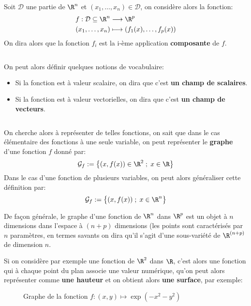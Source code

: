 Soit \(\mathcal{D}\) une partie de \(\R^n\) et \((x_1, \ldots, x_n) \in \mathcal{D}\), on considère alors la fonction:
\[
   \begin{aligned}
      f : \mathcal{D} \subseteq \R^n &\longrightarrow \R^p \\
      (x_1, \ldots, x_n) &\longmapsto (f_1(x), \ldots, f_p(x))
   \end{aligned}
\]
On dira alors que la fonction \(f_i\) est la i-ème application \textbf{composante} de \(f\).\+

\subsection*{}
On peut alors définir quelques notions de vocabulaire:
\begin{itemize}
   \item Si la fonction est à valeur scalaire, on dira que c'est \textbf{un champ de scalaires}.
   \item Si la fonction est à valeur vectorielles, on dira que c'est \textbf{un champ de vecteurs}.
\end{itemize}
\subsection*{}
On cherche alors à représenter de telles fonctions, on sait que dans le cas élémentaire des fonctions à une seule variable, on peut représenter le \textbf{graphe} d'une fonction \(f\) donné par:
\[
   \mathcal{G}_f := \bigl\{ (x, f(x)) \in \R^2 \; ; \; x \in \R \bigl\}   
\]
Dans le cas d'une fonction de plusieurs variables, on peut alors généraliser cette définition par:
\[
   \mathcal{G}_f := \bigl\{ (x, f(x)) \; ; \; x \in \R^n \bigl\}  
\]

De façon générale, le graphe d'une fonction de \(\R^n\) dans \(\R^p\) est un objet à \(n\) dimensions dans l'espace à \((n + p)\) dimensions (les points sont caractérisés par \(n\) paramètres, en termes
savants on dira qu'il s'agit d'une sous-variété de \(\R^{(n + p)}\) de dimension \(n\).\<

Si on considère par exemple une fonction de \(\R^2\) dans \(\R\), c'est alors une fonction qui à chaque point du plan associe une valeur numérique, qu'on peut alors représenter comme \textbf{une hauteur} et on obtient alors \textbf{une surface}, par exemple:

\begin{figure}
   \centering
   \vspace*{-0.5cm}
   \captionsetup{labelformat=empty}
   \caption{Graphe de la fonction \(f : (x, y) \mapsto \exp(-x^2 - y^2)\)}
\end{figure}
\pagebreak

